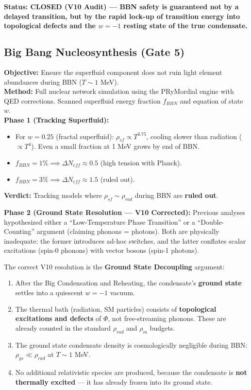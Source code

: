 \documentclass[a4paper,12pt]{article}
\begin{document}
\textbf{Status: CLOSED (V10 Audit) --- BBN safety is guaranteed not by a delayed transition, but by the rapid lock-up of transition energy into topological defects and the $w=-1$ resting state of the true condensate.}

\subsection{Big Bang Nucleosynthesis (Gate 5)}
\textbf{Objective:} Ensure the superfluid component does not ruin light element abundances during BBN ($T \sim 1$ MeV).\\
\textbf{Method:} Full nuclear network simulation using the PRyMordial engine with QED corrections. Scanned superfluid energy fraction $f_{BBN}$ and equation of state $w$.\\

\textbf{Phase 1 (Tracking Superfluid):}
\begin{itemize}
    \item For $w = 0.25$ (fractal superfluid): $\rho_{sf} \propto T^{3.75}$, cooling slower than radiation ($\propto T^4$). Even a small fraction at 1 MeV grows by end of BBN.
    \item $f_{BBN} = 1\% \implies \Delta N_{eff} \approx 0.5$ (high tension with Planck).
    \item $f_{BBN} = 3\% \implies \Delta N_{eff} \approx 1.5$ (ruled out).
\end{itemize}
\textbf{Verdict:} Tracking models where $\rho_{sf} \sim \rho_{rad}$ during BBN are \textbf{ruled out}.

\textbf{Phase 2 (Ground State Resolution --- V10 Corrected):}
Previous analyses hypothesized either a ``Low-Temperature Phase Transition'' or a ``Double-Counting'' argument (claiming phonons = photons). Both are physically inadequate: the former introduces ad-hoc switches, and the latter conflates scalar excitations (spin-0 phonons) with vector bosons (spin-1 photons).

The correct V10 resolution is the \textbf{Ground State Decoupling} argument:
\begin{enumerate}
    \item After the Big Condensation and Reheating, the condensate's \textbf{ground state} settles into a quiescent $w = -1$ vacuum.
    \item The thermal bath (radiation, SM particles) consists of \textbf{topological excitations and defects} of $\Phi$, not free-streaming phonons. These are already counted in the standard $\rho_{rad}$ and $\rho_m$ budgets.
    \item The ground state condensate density is cosmologically negligible during BBN: $\rho_{gs} \ll \rho_{rad}$ at $T \sim 1$ MeV.
    \item No additional relativistic species are produced, because the condensate is \textbf{not thermally excited} --- it has already frozen into its ground state.
\end{enumerate}
\end{document}
